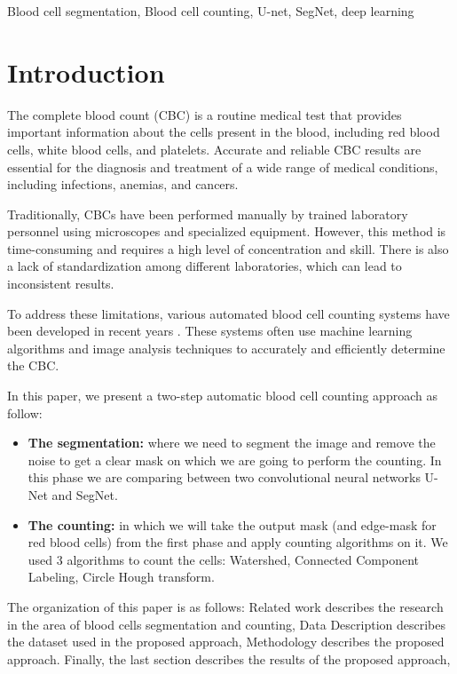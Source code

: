 \documentclass[conference]{IEEEtran}
\begin{document}
\begin{IEEEkeywords}
Blood cell segmentation, Blood cell counting, U-net, SegNet, deep learning 
\end{IEEEkeywords}

\section{Introduction}
The complete blood count (CBC) is a routine medical test that provides important information about the cells present in the blood, including red blood cells, white blood cells, and platelets. Accurate and reliable CBC results are essential for the diagnosis and treatment of a wide range of medical conditions, including infections, anemias, and cancers.

Traditionally, CBCs have been performed manually by trained laboratory personnel using microscopes and specialized equipment. However, this method is time-consuming and requires a high level of concentration and skill. There is also a lack of standardization among different laboratories, which can lead to inconsistent results.

To address these limitations, various automated blood cell counting systems have been developed in recent years \cite{asgari2021deep}. These systems often use machine learning algorithms and image analysis techniques to accurately and efficiently determine the CBC.

In this paper, we present a two-step automatic blood cell counting approach as follow:
\begin{itemize}
    \item \textbf{The segmentation:} where we need to segment the image and remove the noise to get a clear mask on which we are going to perform the counting. In this phase we are comparing between two convolutional neural networks U-Net and SegNet.
    \item \textbf{The counting:} in which we will take the output mask (and edge-mask for red blood cells) from the first phase and apply counting algorithms on it. We used 3 algorithms to count the cells: Watershed, Connected Component Labeling, Circle Hough transform.\\
\end{itemize}

The organization of this paper is as follows: Related work describes the research in the area of blood cells segmentation and counting, Data Description describes the dataset used in the proposed approach, Methodology describes the proposed approach. Finally, the last section describes the results of the proposed approach, 
\end{document}
